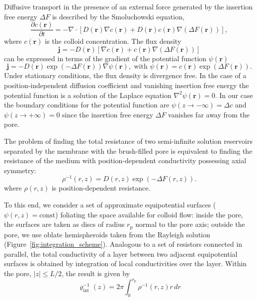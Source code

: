 \documentclass[12pt, a4paper]{article}
\newcommand\todo[1]{\textcolor{red}{#1}}
\begin{document}
Diffusive transport in the presence of an external force generated by the insertion free energy $\Delta F$ is described by the Smoluchowski equation,
\begin{equation}
    \frac{\partial c(\bm{r})}{\partial t}=-\nabla \cdot \left[D(\bm{r}) \nabla c({\bm{r}})+D(\bm{r})c({\bm{r}})\nabla(\Delta F(\bm{r}))\right],
    \label{eq:Smoluch}
\end{equation}
where $c(\bm{r})$ is the colloid concentration.
The flux density 
\begin{equation}
    \bm{j}=- D(\bm{r})\left[\nabla c({\bm{r}})+c({\bm{r}}) \nabla \left(\Delta F(\bm{r})\right)\right]
    \label{eq:j}
\end{equation}
can be expressed in terms of the gradient of the potential function $\psi(\bm{r})$
\begin{equation}
    \bm{j}=- D(\bm{r}) \exp(-\Delta F(\bm{r}))  \nabla \psi(\bm{r}), \text{ with } \psi(\bm{r})=c(\bm{r})\exp(\Delta F(\bm{r})).
    \label{eq:psi}
\end{equation}
Under stationary conditions, the flux density is divergence free. In the case of a position-independent diffusion coefficient and vanishing insertion free energy the potential function is a solution of the Laplace equation $\nabla^2 \psi(\bm{r})=0$.
In our case the boundary conditions for the potential function are $\psi(z\rightarrow -\infty)=\Delta c$ and $\psi(z\rightarrow +\infty)=0$ since the insertion free energy $\Delta F$ vanishes far away from the pore.

The problem of finding the total resistance of two semi-infinite solution reservoirs separated by the membrane with the brush-filled pore is equivalent to finding the resistance of the medium with position-dependent conductivity possessing axial symmetry:
\begin{equation}
    \rho^{-1} (r,z)= D(r,z)\exp(-\Delta F(r,z)).
    \label{eq:rho}
\end{equation}
where $\rho(r,z)$ is position-dependent resistance.

To this end, we consider a set of approximate equipotential surfaces ($\psi(r,z)=\text{const}$) foliating the space available for colloid flow: inside the pore, the surfaces are taken as  discs of radius $r_{\text{p}}$ normal to the pore axis; outside the pore, we use oblate hemispheroids taken from the Rayleigh solution \cite{Strutt1878} (Figure~\ref{fig:integration_scheme}).
Analogous to a set of resistors connected in parallel, the total conductivity of a layer between two adjacent equipotential surfaces is obtained by integration of local conductivities over the layer. Within the pore, $|z|\leq L/2$, the result is given by
\begin{equation}
\varrho_{\text{int}}^{-1}(z)= 2\pi\int_{0}^{r_{\text{p}}^{}} \rho^{-1}(r,z) r \, dr
\label{eq:varrho1}
\end{equation}
\end{document}
